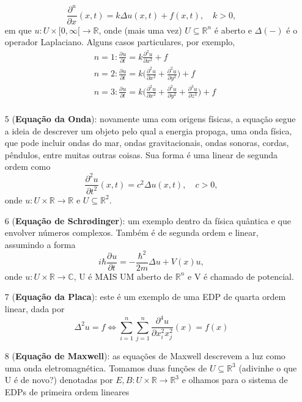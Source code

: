 \documentclass[../pde_notes.tex]{subfiles}
\begin{document}
\begin{example}
\begin{itemize}
		      \[
			      \frac{\partial^{u}}{\partial x^{}}(x, t) = k\Delta u(x, t) + f(x, t),\quad k>0,
		      \]
		      em que \(u:U\times [0, \infty[\rightarrow \mathbb{R}\), onde (mais uma vez) \(U\subseteq \mathbb{R}^{n}\) é aberto e \(\Delta(-)\) é o operador Laplaciano. Alguns casos particulares, por exemplo,
		      \begin{align*}
			       & n=1: \frac{\partial^{}u}{\partial t^{}} = k \frac{\partial^{2}u}{\partial x^{2}} + f                                                                                             \\
			       & n=2: \frac{\partial^{}u}{\partial t^{}} = k \biggl(\frac{\partial^{2}u}{\partial x^{2}} + \frac{\partial^{2}u}{\partial y^{2}}\biggr) + f                                        \\
			       & n=3: \frac{\partial^{}u}{\partial t^{}} = k \biggl(\frac{\partial^{2}u}{\partial x^{2}} + \frac{\partial^{2}u}{\partial y^{2}} + \frac{\partial^{3}u}{\partial z^{3}}\biggr) + f \\
		      \end{align*}
		\item[5](\textbf{Equação da Onda}): novamente uma com origens físicas, a equação segue a ideia de descrever um objeto pelo qual a energia propaga, uma onda física, que pode incluir ondas do mar, ondas gravitacionais, ondas sonoras, cordas, pêndulos, entre muitas outras coisas. Sua forma é uma linear de segunda ordem como
		      \[
			      \frac{\partial^{2}u}{\partial t^{2}}(x, t) = c^{2}\Delta u(x, t), \quad c > 0,
		      \]
		      onde \(u:U\times \mathbb{R}\rightarrow \mathbb{R}\) e \(U\subseteq \mathbb{R}^{2}\).
		\item[6](\textbf{Equação de Schr\o dinger}): um exemplo dentro da física quântica e que envolver números complexos. Também é de segunda ordem e linear, assumindo a forma
		      \[
			      i\hbar \frac{\partial^{}u}{\partial t^{}} = - \frac{\hbar^{2}}{2m}\Delta u + V(x)u,
		      \]
		      onde \(u:U\times \mathbb{R}\rightarrow \mathbb{C}\), U é MAIS UM aberto de \(\mathbb{R}^{n}\) e V é chamado de potencial.
		\item[7](\textbf{Equação da Placa}): este é um exemplo de uma EDP de quarta ordem linear, dada por
		      \[
			      \Delta^{2} u = f \Longleftrightarrow \sum\limits_{i=1}^{n}\sum\limits_{j=1}^{n}\frac{\partial^{4}u}{\partial x_{i}^{2}x_{j}^{2}}(x) = f(x)
		      \]
		\item[8](\textbf{Equação de Maxwell}): as equações de Maxwell descrevem a luz como uma onda eletromagnética. Tomamos duas funções de \(U\subseteq \mathbb{R}^{3}\) (adivinhe o que U é de novo?) denotadas por \(E, B:U\times \mathbb{R}\rightarrow \mathbb{R}^{3}\) e olhamos para o sistema de EDPs de primeira ordem lineares

\end{itemize}
\end{example}
\end{document}

